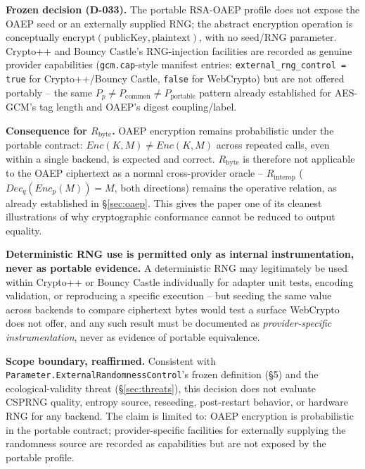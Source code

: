 \documentclass[11pt,a4paper]{article}
\begin{document}
\textbf{Frozen decision (D-033).} The portable RSA-OAEP profile does not expose the OAEP seed or an externally supplied RNG; the abstract encryption operation is conceptually $\text{encrypt}(\text{publicKey}, \text{plaintext})$, with no seed/RNG parameter. Crypto++ and Bouncy Castle's RNG-injection facilities are recorded as genuine provider capabilities (\texttt{gcm.cap}-style manifest entries: \texttt{external\_rng\_control = true} for Crypto++/Bouncy Castle, \texttt{false} for WebCrypto) but are not offered portably -- the same $P_p \neq P_{\text{common}} \neq P_{\text{portable}}$ pattern already established for AES-GCM's tag length and OAEP's digest coupling/label.

\textbf{Consequence for $R_{\text{byte}}$.} OAEP encryption remains probabilistic under the portable contract: $Enc(K,M) \neq Enc(K,M)$ across repeated calls, even within a single backend, is expected and correct. $R_{\text{byte}}$ is therefore not applicable to the OAEP ciphertext as a normal cross-provider oracle -- $R_{\text{interop}}$ ($Dec_q(Enc_p(M))=M$, both directions) remains the operative relation, as already established in \S\ref{sec:oaep}. This gives the paper one of its cleanest illustrations of why cryptographic conformance cannot be reduced to output equality.

\textbf{Deterministic RNG use is permitted only as internal instrumentation, never as portable evidence.} A deterministic RNG may legitimately be used within Crypto++ or Bouncy Castle individually for adapter unit tests, encoding validation, or reproducing a specific execution -- but seeding the same value across backends to compare ciphertext bytes would test a surface WebCrypto does not offer, and any such result must be documented as \emph{provider-specific instrumentation}, never as evidence of portable equivalence.

\textbf{Scope boundary, reaffirmed.} Consistent with \texttt{Parameter.ExternalRandomnessControl}'s frozen definition (\S5) and the ecological-validity threat (\S\ref{sec:threats}), this decision does not evaluate CSPRNG quality, entropy source, reseeding, post-restart behavior, or hardware RNG for any backend. The claim is limited to: OAEP encryption is probabilistic in the portable contract; provider-specific facilities for externally supplying the randomness source are recorded as capabilities but are not exposed by the portable profile.
\end{document}
